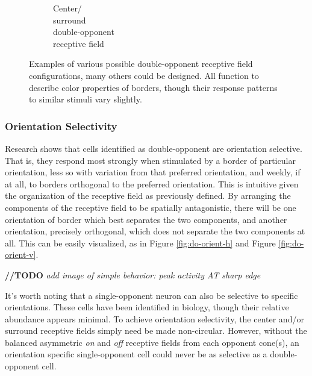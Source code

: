 \documentclass[journal,onecolumn]{IEEEtran}
\begin{document}
\begin{figure}[H]
\begin{subfigure}{0.3\textwidth}
        \caption{Center/ \\ surround \\ double-opponent \\ receptive field}
    \end{subfigure}%
    \caption{Examples of various possible double-opponent receptive field configurations, many others could be designed. All function to describe color properties of borders, though their response patterns to similar stimuli vary slightly.}
\end{figure}


\subsubsection*{Orientation Selectivity}

Research shows that cells identified as double-opponent are orientation selective. That is, they respond most strongly when stimulated by a border of particular orientation, less so with variation from that preferred orientation, and weekly, if at all, to borders orthogonal to the preferred orientation. This is intuitive given the organization of the receptive field as previously defined. By arranging the components of the receptive field to be spatially antagonistic, there will be one orientation of border which best separates the two components, and another orientation, precisely orthogonal, which does not separate the two components at all. This can be easily visualized, as in Figure \ref{fig:do-orient-h} and Figure \ref{fig:do-orient-v}.

\bigskip

\textbf{//TODO} \textit{add image of simple behavior: peak activity AT sharp edge}

\bigskip

It's worth noting that a single-opponent neuron can also be selective to specific orientations. These cells have been identified in biology, though their relative abundance appears minimal. To achieve orientation selectivity, the center and/or surround receptive fields simply need be made non-circular. However, without the balanced asymmetric \textit{on} and \textit{off} receptive fields from each opponent cone(s), an orientation specific single-opponent cell could never be as selective as a double-opponent cell.
\end{document}
